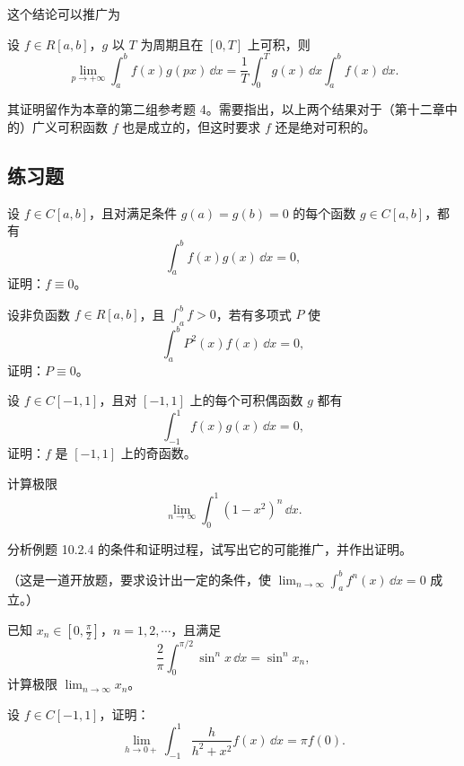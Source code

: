 这个结论可以推广为

\begin{xexample}[10.2.7（Riemann 定理）]
设 $f\in R[a,b]$，$g$ 以 $T$ 为周期且在 $[0,T]$ 上可积，则
\[
  \lim_{p\to+\infty}\int_a^b f(x)g(px)\,\dd x
  =\frac1T\int_0^T g(x)\,\dd x\int_a^b f(x)\,\dd x.
\]
\end{xexample}

其证明留作为本章的第二组参考题 4。需要指出，以上两个结果对于（第十二章中的）广义可积函数 $f$ 也是成立的，但这时要求 $f$ 还是绝对可积的。

\subsection{练习题}

\begin{xexercise}[1]
设 $f\in C[a,b]$，且对满足条件 $g(a)=g(b)=0$ 的每个函数 $g\in C[a,b]$，都有
\[
  \int_a^b f(x)g(x)\,\dd x=0,
\]
证明：$f\equiv0$。
\end{xexercise}

\begin{xexercise}[2]
设非负函数 $f\in R[a,b]$，且 $\int_a^b f>0$，若有多项式 $P$ 使
\[
  \int_a^b P^2(x)f(x)\,\dd x=0,
\]
证明：$P\equiv0$。
\end{xexercise}

\begin{xexercise}[3]
设 $f\in C[-1,1]$，且对 $[-1,1]$ 上的每个可积偶函数 $g$ 都有
\[
  \int_{-1}^1 f(x)g(x)\,\dd x=0,
\]
证明：$f$ 是 $[-1,1]$ 上的奇函数。
\end{xexercise}

\begin{xexercise}[4]
计算极限
\[
  \lim_{n\to\infty}\int_0^1(1-x^2)^n\,\dd x.
\]
\end{xexercise}

\begin{xexercise}[5]
分析例题 10.2.4 的条件和证明过程，试写出它的可能推广，并作出证明。

（这是一道开放题，要求设计出一定的条件，使 $\lim_{n\to\infty}\int_a^b f^n(x)\,\dd x=0$ 成立。）
\end{xexercise}

\begin{xexercise}[6]
已知 $x_n\in[0,\frac\pi2]$，$n=1,2,\cdots$，且满足
\[
  \frac2\pi\int_0^{\pi/2}\sin^n x\,\dd x=\sin^n x_n,
\]
计算极限 $\lim_{n\to\infty}x_n$。
\end{xexercise}

\begin{xexercise}[7]
设 $f\in C[-1,1]$，证明：
\[
  \lim_{h\to0+}\int_{-1}^1\frac{h}{h^2+x^2}f(x)\,\dd x=\pi f(0).
\]
\end{xexercise}

